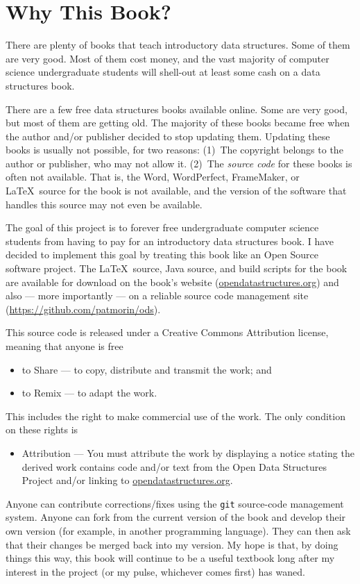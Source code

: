 \chapter*{Why This Book?}

There are plenty of books that teach introductory data structures.
Some of them are very good.  Most of them cost money, and the vast
majority of computer science undergraduate students will shell-out at
least some cash on a data structures book.

There are a few free data structures books available online.  Some are
very good, but most of them are getting old.  The majority of these
books became free when the author and/or publisher decided to stop
updating them.  Updating these books is usually not possible, for two
reasons:  (1)~The copyright belongs to the author or publisher, who
may not allow it.  (2)~The \emph{source code} for these books is often
not available.  That is, the Word, WordPerfect, FrameMaker, or \LaTeX\
source for the book is not available, and the version of the software
that handles this source may not even be available.

The goal of this project is to forever free undergraduate computer
science students from having to pay for an introductory data
structures book.  I have decided to implement this goal by treating
this book like an Open Source software project.  The \LaTeX\ source,
Java source, and build scripts for the book are available for download
on the book's website (\url{opendatastructures.org}) and also ---
more importantly --- on a reliable source code management site
(\url{https://github.com/patmorin/ods}).

This source code is released under a Creative Commons Attribution license,
meaning that anyone is free
\begin{itemize}
  \item to Share --- to copy, distribute and transmit the work; and
  \item to Remix --- to adapt the work.
\end{itemize}
This includes the right to make commercial use of the work.  The only
condition on these rights is
\begin{itemize}
  \item Attribution --- You must attribute the work by displaying a
  notice stating the derived work contains code and/or text from the
  Open Data Structures Project and/or linking to
  \url{opendatastructures.org}.
\end{itemize}

Anyone can contribute corrections/fixes using the \texttt{git} source-code
management system.  Anyone can fork from the current version of the
book and develop their own version (for example, in another programming
language).  They can then ask that their changes be merged back into
my version.  My hope is that, by doing things this way, this book will
continue to be a useful textbook long after my interest in the project
(or my pulse, whichever comes first) has waned.


